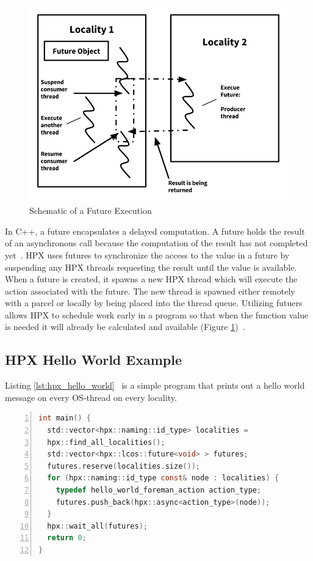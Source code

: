 \begin{figure}[ht]
\centering
\includegraphics[scale=0.33]{images/future_schematics.png}
\caption[Schematic of a Future Execution]{Schematic of a Future Execution}
\label{fig:future_schematics}
\end{figure}

In C++, a future encapsulates a delayed computation. A future holds the result of an asynchronous call because the computation of the result has not completed yet~\cite{stroustrup2013c++}. HPX uses futures to synchronize the access to the value in a future by suspending any HPX threads requesting the result until the value is available. When a future is created, it spawns a new HPX thread which will execute the action associated with the future. The new thread is spawned either remotely with a parcel or locally by being placed into the thread queue.  Utilizing futuers allows HPX to schedule work early in a program so that when the function value is needed it will already be calculated and available (Figure \ref{fig:future_schematics})~\cite{kaiser2009parallex}.


\subsection{HPX Hello World Example}
Listing \ref{lst:hpx_hello_world}~\cite{hpx_hello} is a simple program that prints out a hello world message on every OS-thread on every locality.

\begin{lstlisting}[language=C, frame=single, numbers=left, basicstyle=\footnotesize, caption=HPX Hello World\label{lst:hpx_hello_world}]
int main() {
  std::vector<hpx::naming::id_type> localities =
  hpx::find_all_localities();
  std::vector<hpx::lcos::future<void> > futures;
  futures.reserve(localities.size());
  for (hpx::naming::id_type const& node : localities) {
    typedef hello_world_foreman_action action_type;
    futures.push_back(hpx::async<action_type>(node));
  }
  hpx::wait_all(futures);
  return 0;
}
\end{lstlisting}

